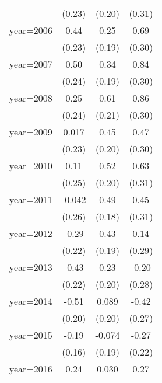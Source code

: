\begin{sidewaystable}[htbp]
\begin{tabular}{l*{3}{c}}
                &   (0.23)         &   (0.20)         &   (0.31)         \\
\addlinespace
year=2006       &     0.44\sym{*}  &     0.25         &     0.69\sym{**} \\
                &   (0.23)         &   (0.19)         &   (0.30)         \\
\addlinespace
year=2007       &     0.50\sym{**} &     0.34\sym{*}  &     0.84\sym{***}\\
                &   (0.24)         &   (0.19)         &   (0.30)         \\
\addlinespace
year=2008       &     0.25         &     0.61\sym{***}&     0.86\sym{***}\\
                &   (0.24)         &   (0.21)         &   (0.30)         \\
\addlinespace
year=2009       &    0.017         &     0.45\sym{**} &     0.47         \\
                &   (0.23)         &   (0.20)         &   (0.30)         \\
\addlinespace
year=2010       &     0.11         &     0.52\sym{**} &     0.63\sym{**} \\
                &   (0.25)         &   (0.20)         &   (0.31)         \\
\addlinespace
year=2011       &   -0.042         &     0.49\sym{***}&     0.45         \\
                &   (0.26)         &   (0.18)         &   (0.31)         \\
\addlinespace
year=2012       &    -0.29         &     0.43\sym{**} &     0.14         \\
                &   (0.22)         &   (0.19)         &   (0.29)         \\
\addlinespace
year=2013       &    -0.43\sym{*}  &     0.23         &    -0.20         \\
                &   (0.22)         &   (0.20)         &   (0.28)         \\
\addlinespace
year=2014       &    -0.51\sym{**} &    0.089         &    -0.42         \\
                &   (0.20)         &   (0.20)         &   (0.27)         \\
\addlinespace
year=2015       &    -0.19         &   -0.074         &    -0.27         \\
                &   (0.16)         &   (0.19)         &   (0.22)         \\
\addlinespace
year=2016       &     0.24\sym{***}&    0.030         &     0.27\sym{*}  \\

\end{tabular}
\end{sidewaystable}
